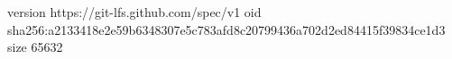 version https://git-lfs.github.com/spec/v1
oid sha256:a2133418e2e59b6348307e5c783afd8c20799436a702d2ed84415f39834ce1d3
size 65632
